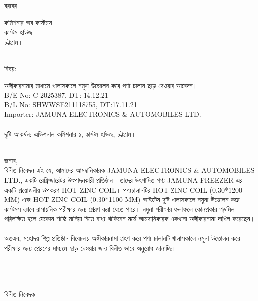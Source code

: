 \documentclass[12pt]{article}
\newcommand{\beno}{C-2025387}
\newcommand{\bedt}{14.12.21}
\newcommand{\blno}{SHWWSE211118755}
\newcommand{\bldt}{17.11.21}
\newcommand{\good}{HOT ZINC COIL}
\newcommand{\product}{JAMUNA FREEZER}
\newcommand{\impn}{JAMUNA ELECTRONICS \& AUTOMOBILES LTD.}
\begin{document}
\noindent
বরাবর
\\
\begin{minipage}[t]{0.06\linewidth}
\hspace{1em}
\end{minipage}
\begin{minipage}[t]{0.94\linewidth}
কমিশনার অব কাস্টমস
\\
কাস্টম হাউজ
\\
চট্টগ্রাম।
\\
\\
\end{minipage}
\begin{minipage}[t]{0.06\linewidth}
বিষয়:
\end{minipage}
\begin{minipage}[t]{0.94\linewidth}
অঙ্গীকারনামার মাধ্যমে খালাসকালে নমুনা উত্তোলন করে পণ্য চালান ছাড় দেওয়ার আবেদন।
\\
B/E No: {\beno}, DT: {\bedt}
\\
B/L No: {\blno}, DT:{\bldt}
\\
Importer: {\impn}
\\
\\
দৃষ্টি আকর্ষন: এডিশনাল কমিশনার-১, কাস্টম হাউজ, চট্টগ্রাম।
\\
\\
\end{minipage}
জনাব,
\\
\hspace*{2.7em}বিনীত নিবেদন এই যে, আমাদের আমদানিকারক {\impn},
একটি রেফ্রিজারেটর উৎপাদনকারী প্রতিষ্ঠান। তাদের উৎপাদিত পণ্য {\product} এর
একটি প্রয়োজনীয় উপকরণ {\good}।
পণ্যচালানটির
HOT ZINC COIL (0.30*1200 MM)
এবং
HOT ZINC COIL (0.30*1100 MM)
আইটেম দুটি
খালাসকালে নমুনা উত্তোলন করে কাস্টমস ল্যাবে রাসায়নিক পরীক্ষার জন্য
প্রেরণ করা যেতে পারে।
নমুনা পরীক্ষার ফলাফলে কোনপ্রকার গড়মিল পরিলক্ষিত হলে যেকোন
শাস্তি মানিয়া নিতে বাধ্য থাকিবেন মর্মে আমদানিকারক একখানা
অঙ্গীকারনামা দাখিল করেছেন।
\\
\\
অতএব, মহোদয় শিল্প প্রতিষ্ঠান বিবেচনায় অঙ্গীকারনামা গ্রহণ করে
পণ্য চালানটি
খালাসকালে নমুনা উত্তোলন করে পরীক্ষার জন্য প্রেরণের মাধ্যমে
ছাড় দেওয়ার জন্য বিনীত ভাবে অনুরোধ জানাচ্ছি।
\\
\\
\\
\\
\begin{minipage}[t]{0.50\linewidth}
\hspace{1em}
\end{minipage}
\begin{minipage}[t]{0.60\linewidth}
বিনীত নিবেদক
\\
\\
\\
\\
\\
{\cnfn}
\end{minipage}
\thispagestyle{laststyle}
\end{document}
